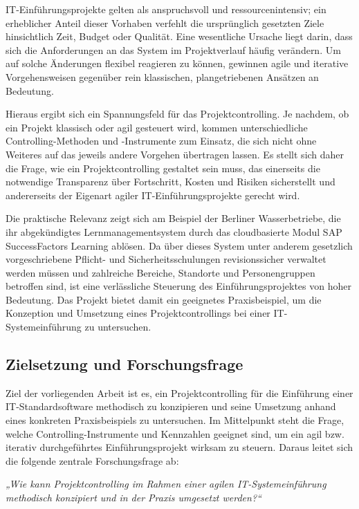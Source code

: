 \documentclass[
    12pt, 
    a4paper,
    ]{scrartcl} %
\begin{document}
IT-Einführungsprojekte gelten als anspruchsvoll und ressourcenintensiv; ein erheblicher Anteil dieser Vorhaben verfehlt die ursprünglich gesetzten Ziele hinsichtlich Zeit, Budget oder Qualität. Eine wesentliche Ursache liegt darin, dass sich die Anforderungen an das System im Projektverlauf häufig verändern. Um auf solche Änderungen flexibel reagieren zu können, gewinnen agile und iterative Vorgehensweisen gegenüber rein klassischen, plangetriebenen Ansätzen an Bedeutung.

Hieraus ergibt sich ein Spannungsfeld für das Projektcontrolling. Je nachdem, ob ein Projekt klassisch oder agil gesteuert wird, kommen unterschiedliche Controlling-Methoden und -Instrumente zum Einsatz, die sich nicht ohne Weiteres auf das jeweils andere Vorgehen übertragen lassen. Es stellt sich daher die Frage, wie ein Projektcontrolling gestaltet sein muss, das einerseits die notwendige Transparenz über Fortschritt, Kosten und Risiken sicherstellt und andererseits der Eigenart agiler IT-Einführungsprojekte gerecht wird.

Die praktische Relevanz zeigt sich am Beispiel der Berliner Wasserbetriebe, die ihr abgekündigtes Lernmanagementsystem durch das cloudbasierte Modul SAP SuccessFactors Learning ablösen. Da über dieses System unter anderem gesetzlich vorgeschriebene Pflicht- und Sicherheitsschulungen revisionssicher verwaltet werden müssen und zahlreiche Bereiche, Standorte und Personengruppen betroffen sind, ist eine verlässliche Steuerung des Einführungsprojektes von hoher Bedeutung. Das Projekt bietet damit ein geeignetes Praxisbeispiel, um die Konzeption und Umsetzung eines Projektcontrollings bei einer IT-Systemeinführung zu untersuchen.

\subsection{Zielsetzung und Forschungsfrage}
Ziel der vorliegenden Arbeit ist es, ein Projektcontrolling für die Einführung einer IT-Standardsoftware methodisch zu konzipieren und seine Umsetzung anhand eines konkreten Praxisbeispiels zu untersuchen. Im Mittelpunkt steht die Frage, welche Controlling-Instrumente und Kennzahlen geeignet sind, um ein agil bzw. iterativ durchgeführtes Einführungsprojekt wirksam zu steuern. Daraus leitet sich die folgende zentrale Forschungsfrage ab:

\textit{„Wie kann Projektcontrolling im Rahmen einer agilen IT-Systemeinführung methodisch konzipiert und in der Praxis umgesetzt werden?“}
\end{document}
